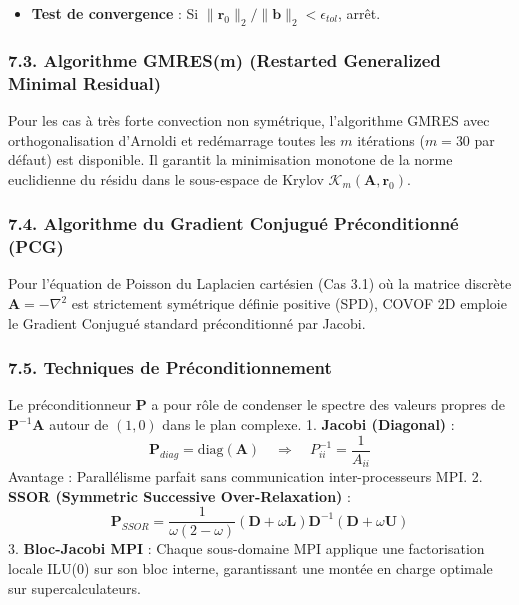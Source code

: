 \documentclass[
  french,
]{article}
\begin{document}
\begin{enumerate}
\begin{itemize}
    Mise à jour :
    \[\mathbf{x} \leftarrow \mathbf{x} + \gamma_1 \mathbf{r}_0 + \gamma_2 \mathbf{r}_1\]
    \[\mathbf{r}_0 \leftarrow \mathbf{r}_0 - (\gamma_1 \mathbf{r}_1 + \gamma_2 \mathbf{r}_2)\]
    \[\mathbf{u}_0 \leftarrow \mathbf{u}_0 - (\gamma_1 \mathbf{u}_1 + \gamma_2 \mathbf{u}_2)\]
    \[\omega = \gamma_2\]
  \item
    \textbf{Test de convergence} : Si
    \(\|\mathbf{r}_0\|_2 / \|\mathbf{b}\|_2 < \epsilon_{tol}\), arrêt.
  \end{itemize}
\end{enumerate}

\subsubsection{7.3. Algorithme GMRES(m) (Restarted Generalized Minimal
Residual)}\label{algorithme-gmresm-restarted-generalized-minimal-residual}

Pour les cas à très forte convection non symétrique, l'algorithme GMRES
avec orthogonalisation d'Arnoldi et redémarrage toutes les \(m\)
itérations (\(m = 30\) par défaut) est disponible. Il garantit la
minimisation monotone de la norme euclidienne du résidu dans le
sous-espace de Krylov \(\mathcal{K}_m(\mathbf{A}, \mathbf{r}_0)\).

\subsubsection{7.4. Algorithme du Gradient Conjugué Préconditionné
(PCG)}\label{algorithme-du-gradient-conjuguuxe9-pruxe9conditionnuxe9-pcg}

Pour l'équation de Poisson du Laplacien cartésien (Cas 3.1) où la
matrice discrète \(\mathbf{A} = -\nabla^2\) est strictement symétrique
définie positive (SPD), COVOF 2D emploie le Gradient Conjugué standard
préconditionné par Jacobi.

\subsubsection{7.5. Techniques de
Préconditionnement}\label{techniques-de-pruxe9conditionnement}

Le préconditionneur \(\mathbf{P}\) a pour rôle de condenser le spectre
des valeurs propres de \(\mathbf{P}^{-1}\mathbf{A}\) autour de
\((1, 0)\) dans le plan complexe. 1. \textbf{Jacobi (Diagonal)} :
\[\mathbf{P}_{diag} = \text{diag}(\mathbf{A}) \quad \Longrightarrow \quad P_{ii}^{-1} = \frac{1}{A_{ii}}\]
Avantage : Parallélisme parfait sans communication inter-processeurs
MPI. 2. \textbf{SSOR (Symmetric Successive Over-Relaxation)} :
\[\mathbf{P}_{SSOR} = \frac{1}{\omega(2-\omega)} (\mathbf{D} + \omega \mathbf{L}) \mathbf{D}^{-1} (\mathbf{D} + \omega \mathbf{U})\]
3. \textbf{Bloc-Jacobi MPI} : Chaque sous-domaine MPI applique une
factorisation locale ILU(0) sur son bloc interne, garantissant une
montée en charge optimale sur supercalculateurs.
\end{document}
